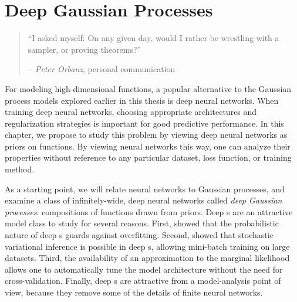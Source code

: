 
\inbpdocument


\chapter{Deep Gaussian Processes}
\label{ch:deep-limits}

\begin{quotation}
``I asked myself: On any given day, would I rather be wrestling with a sampler, or proving theorems?''

\hspace*{\fill} \emph{ -- Peter Orbanz}, personal communication
\end{quotation}

For modeling high-dimensional functions, a popular alternative to the Gaussian process models explored earlier in this thesis is deep neural networks.
When training deep neural networks, choosing appropriate architectures and regularization strategies is important for good predictive performance.
In this chapter, we propose to study this problem by viewing deep neural networks as priors on functions.
By viewing neural networks this way, one can analyze their properties without reference to any particular dataset, loss function, or training method.

As a starting point, we will relate neural networks to Gaussian processes, and examine a class of infinitely-wide, deep neural networks called \emph{deep Gaussian processes}: compositions of functions drawn from \gp{} priors.
Deep \gp{}s are an attractive model class to study for several reasons.
First, \citet{damianou2012deep} showed that the probabilistic nature of deep \gp{}s guards against overfitting.
Second, \citet{hensman2014deep} showed that stochastic variational inference is possible in deep \gp{}s, allowing mini-batch training on large datasets.
Third, the availability of an approximation to the marginal likelihood allows one to automatically tune the model architecture without the need for cross-validation.
Finally, deep \gp{}s are attractive from a model-analysis point of view, because they remove some of the details of finite neural networks. %

